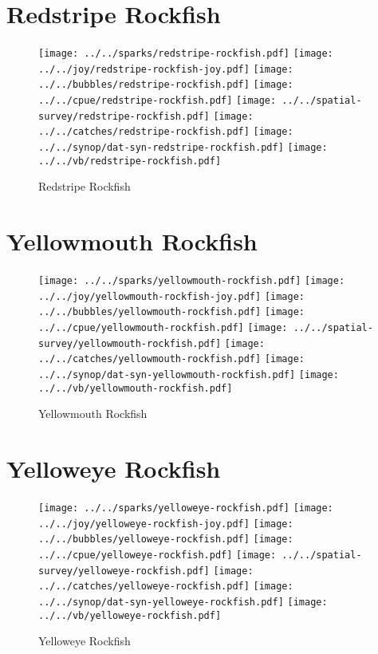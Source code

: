 \section{Redstripe Rockfish}

\begin{figure}[htbp]
\centering
\texttt{[image: ../../sparks/redstripe-rockfish.pdf]}
\texttt{[image: ../../joy/redstripe-rockfish-joy.pdf]}
\texttt{[image: ../../bubbles/redstripe-rockfish.pdf]}
\texttt{[image: ../../cpue/redstripe-rockfish.pdf]}
\texttt{[image: ../../spatial-survey/redstripe-rockfish.pdf]}
\texttt{[image: ../../catches/redstripe-rockfish.pdf]}
\texttt{[image: ../../synop/dat-syn-redstripe-rockfish.pdf]}
\texttt{[image: ../../vb/redstripe-rockfish.pdf]}
\caption{Redstripe Rockfish}
\end{figure}
\clearpage
\section{Yellowmouth Rockfish}

\begin{figure}[htbp]
\centering
\texttt{[image: ../../sparks/yellowmouth-rockfish.pdf]}
\texttt{[image: ../../joy/yellowmouth-rockfish-joy.pdf]}
\texttt{[image: ../../bubbles/yellowmouth-rockfish.pdf]}
\texttt{[image: ../../cpue/yellowmouth-rockfish.pdf]}
\texttt{[image: ../../spatial-survey/yellowmouth-rockfish.pdf]}
\texttt{[image: ../../catches/yellowmouth-rockfish.pdf]}
\texttt{[image: ../../synop/dat-syn-yellowmouth-rockfish.pdf]}
\texttt{[image: ../../vb/yellowmouth-rockfish.pdf]}
\caption{Yellowmouth Rockfish}
\end{figure}
\clearpage
\section{Yelloweye Rockfish}

\begin{figure}[htbp]
\centering
\texttt{[image: ../../sparks/yelloweye-rockfish.pdf]}
\texttt{[image: ../../joy/yelloweye-rockfish-joy.pdf]}
\texttt{[image: ../../bubbles/yelloweye-rockfish.pdf]}
\texttt{[image: ../../cpue/yelloweye-rockfish.pdf]}
\texttt{[image: ../../spatial-survey/yelloweye-rockfish.pdf]}
\texttt{[image: ../../catches/yelloweye-rockfish.pdf]}
\texttt{[image: ../../synop/dat-syn-yelloweye-rockfish.pdf]}
\texttt{[image: ../../vb/yelloweye-rockfish.pdf]}
\caption{Yelloweye Rockfish}
\end{figure}
\clearpage
